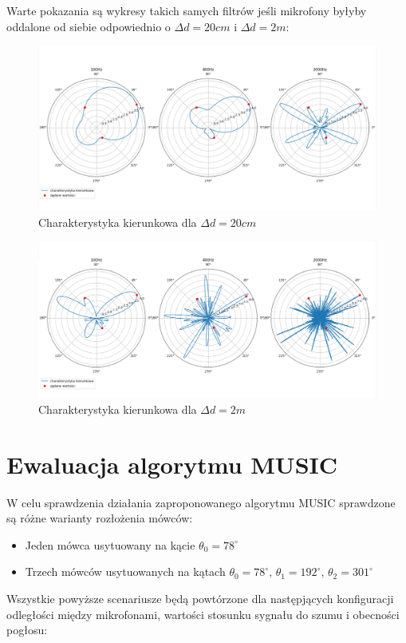 \noindent Warte pokazania są wykresy takich samych filtrów jeśli mikrofony byłyby oddalone od siebie odpowiednio o $\Delta d = 20cm$ i $\Delta d = 2m$:

\begin{figure}[h!]
    \centering
    \includegraphics[width=\textwidth]{Images/directivity0.2m.png}
    \caption{Charakterystyka kierunkowa dla $\Delta d = 20cm$}
    \label{fig:directivity0.2}
\end{figure}

\begin{figure}[h!]
    \centering
    \includegraphics[width=\textwidth]{Images/directivity2m.png}
    \caption{Charakterystyka kierunkowa dla $\Delta d = 2m$}
    \label{fig:directivity2}
\end{figure}

\newpage

\section{Ewaluacja algorytmu MUSIC}

\noindent W celu sprawdzenia działania zaproponowanego algorytmu MUSIC sprawdzone są różne warianty rozłożenia mówców:

\begin{itemize}
    \item Jeden mówca usytuowany na kącie $\theta_{0} = 78^{\circ}$
    \item Trzech mówców usytuowanych na kątach $\theta_{0} = 78^{\circ}, \, \theta_{1} = 192^{\circ}, \, \theta_{2} = 301^{\circ}$
\end{itemize}
\noindent Wszystkie powyższe scenariusze będą powtórzone dla następjących konfiguracji odległości między mikrofonami, wartości stosunku sygnału do szumu i obecności pogłosu:

